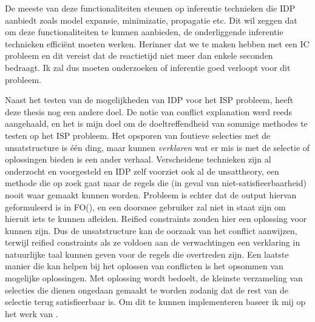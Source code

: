 De meeste van deze functionaliteiten steunen op inferentie technieken die IDP aanbiedt zoals model expansie, minimizatie, propagatie etc. Dit wil zeggen dat om deze functionaliteiten te kunnen aanbieden, de onderliggende inferentie technieken effici\"{e}nt moeten werken. Herinner dat we te maken hebben met een IC probleem en dit vereist dat de reactietijd niet meer dan enkele seconden bedraagt. Ik zal dus moeten onderzoeken of inferentie goed verloopt voor dit probleem.

Naast het testen van de mogelijkheden van IDP voor het ISP probleem, heeft deze thesis nog een andere doel. De notie van conflict explanation werd reeds aangehaald, en het is mijn doel om de doeltreffendheid van sommige methodes te testen op het ISP probleem. Het opsporen van foutieve selecties met de unsatstructure is \'{e}\'{e}n ding, maar kunnen \textit{verklaren} wat er mis is met de selectie of oplossingen bieden is een ander verhaal. Verscheidene technieken zijn al onderzocht en voorgesteld en IDP zelf voorziet ook al de unsattheory, een methode die op zoek gaat naar de regels die (in geval van niet-satisfieerbaarheid) nooit waar gemaakt kunnen worden. Probleem is echter dat de output hiervan geformuleerd is in FO(\textperiodcentered), en een doorsnee gebruiker zal niet in staat zijn om hieruit iets te kunnen afleiden. Reified constraints zouden hier een oplossing voor kunnen zijn. Dus de unsatstructure kan de oorzaak van het conflict aanwijzen, terwijl reified constraints als ze voldoen aan de verwachtingen een verklaring in natuurlijke taal kunnen geven voor de regels die overtreden zijn. Een laatste manier die kan helpen bij het oplossen van conflicten is het opsommen van mogelijke oplossingen. Met oplossing wordt bedoelt, de kleinste verzameling van selecties die dienen ongedaan gemaakt te worden zodanig dat de rest van de selectie terug satisfieerbaar is. Om dit te kunnen implementeren baseer ik mij op het werk van \citep{amilhastre2002consistency}.

